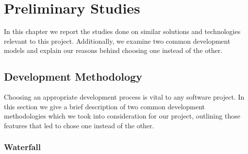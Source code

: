 \chapter{Preliminary Studies}
\label{Preliminary Studies}

In this chapter we report the studies done on similar solutions and technologies relevant
to this project. Additionally, we examine two common development models and
explain our reasons behind choosing one instead of the other.



\section{Development Methodology}
\label{section:development-methodology}

Choosing an appropriate development process is vital to any software project.
In this section we give a brief description of two common development methodologies which we
took into consideration for our project, outlining those features that led to chose one instead of the other.

\subsection{Waterfall} \nocite{WaterfallModel}

